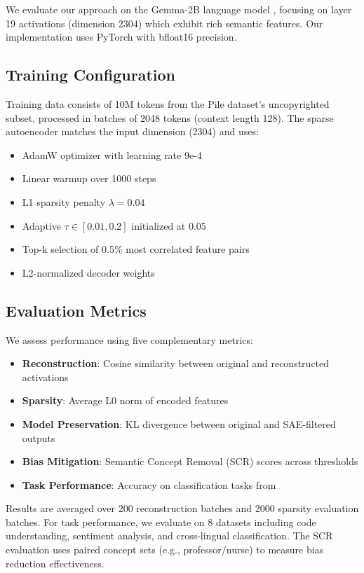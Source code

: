 \documentclass{article} %
\begin{document}
We evaluate our approach on the Gemma-2B language model \cite{Mesnard2024GemmaOM}, focusing on layer 19 activations (dimension 2304) which exhibit rich semantic features. Our implementation uses PyTorch \cite{paszke2019pytorch} with bfloat16 precision.

\subsection{Training Configuration}
Training data consists of 10M tokens from the Pile dataset's uncopyrighted subset, processed in batches of 2048 tokens (context length 128). The sparse autoencoder matches the input dimension (2304) and uses:

\begin{itemize}
    \item AdamW optimizer \cite{loshchilov2017adamw} with learning rate 9e-4
    \item Linear warmup over 1000 steps
    \item L1 sparsity penalty $\lambda=0.04$
    \item Adaptive $\tau \in [0.01, 0.2]$ initialized at 0.05
    \item Top-k selection of 0.5\% most correlated feature pairs
    \item L2-normalized decoder weights
\end{itemize}

\subsection{Evaluation Metrics}
We assess performance using five complementary metrics:

\begin{itemize}
    \item \textbf{Reconstruction}: Cosine similarity between original and reconstructed activations
    \item \textbf{Sparsity}: Average L0 norm of encoded features
    \item \textbf{Model Preservation}: KL divergence between original and SAE-filtered outputs
    \item \textbf{Bias Mitigation}: Semantic Concept Removal (SCR) scores across thresholds
    \item \textbf{Task Performance}: Accuracy on classification tasks from \cite{Cunningham2023SparseAF}
\end{itemize}

Results are averaged over 200 reconstruction batches and 2000 sparsity evaluation batches. For task performance, we evaluate on 8 datasets including code understanding, sentiment analysis, and cross-lingual classification. The SCR evaluation uses paired concept sets (e.g., professor/nurse) to measure bias reduction effectiveness.
\end{document}
